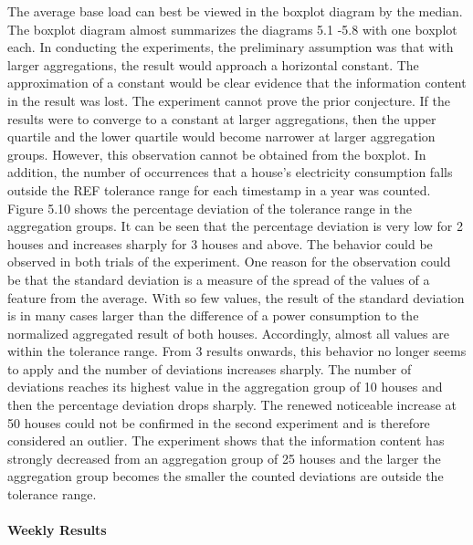 The average base load can best be viewed in the boxplot diagram by the median. The boxplot diagram almost summarizes the diagrams 5.1 -5.8 with one boxplot each. In conducting the experiments, the preliminary assumption was that with larger aggregations, the result would approach a horizontal constant. The approximation of a constant would be clear evidence that the information content in the result was lost. The experiment cannot prove the prior conjecture. If the results were to converge to a constant at larger aggregations, then the upper quartile and the lower quartile would become narrower at larger aggregation groups. However, this observation cannot be obtained from the boxplot. 
In addition, the number of occurrences that a house's electricity consumption falls outside the REF tolerance range for each timestamp in a year was counted. Figure 5.10 shows the percentage deviation of the tolerance range in the aggregation groups. It can be seen that the percentage deviation is very low for 2 houses and increases sharply for 3 houses and above. The behavior could be observed in both trials of the experiment. One reason for the observation could be that the standard deviation is a measure of the spread of the values of a feature from the average. With so few values, the result of the standard deviation is in many cases larger than the difference of a power consumption to the normalized aggregated result of both houses. Accordingly, almost all values are within the tolerance range. From 3 results onwards, this behavior no longer seems to apply and the number of deviations increases sharply. The number of deviations reaches its highest value in the aggregation group of 10 houses and then the percentage deviation drops sharply. The renewed noticeable increase at 50 houses could not be confirmed in the second experiment and is therefore considered an outlier. The experiment shows that the information content has strongly decreased from an aggregation group of 25 houses and the larger the aggregation group becomes the smaller the counted deviations are outside the tolerance range.
\\
\\
\textbf{Weekly Results}
\\
\\
